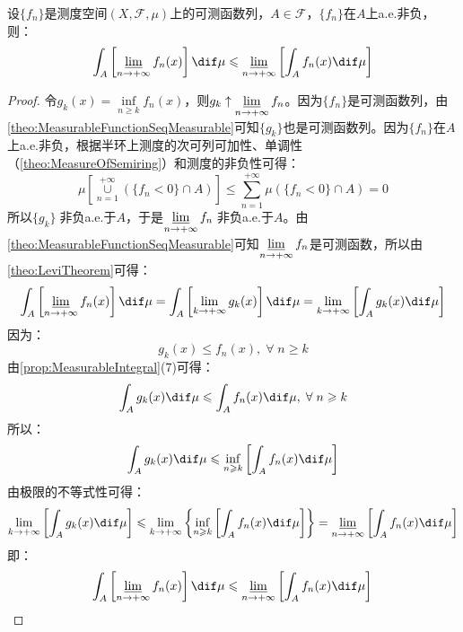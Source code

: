 \begin{theorem}\label{theo:FatouLemma}
	设$\{f_n\}$是测度空间$(X,\mathscr{F},\mu)$上的可测函数列，$A\in\mathscr{F}$，$\{f_n\}$在$A$上a.e.非负，则：
	\begin{equation*}
		\int_{A}\left[\varliminf_{n\to+\infty}f_n(x)\right]\dif\mu\leqslant\varliminf_{n\to+\infty}\left[\int_{A}f_n(x)\dif\mu\right]
	\end{equation*}
\end{theorem}
\begin{proof}
	令$g_k(x)=\inf\limits_{n\geqslant k}f_n(x)$，则$g_k\uparrow\varliminf\limits_{n\to+\infty}f_n$。因为$\{f_n\}$是可测函数列，由\cref{theo:MeasurableFunctionSeqMeasurable}可知$\{g_k\}$也是可测函数列。因为$\{f_n\}$在$A$上a.e.非负，根据半环上测度的次可列可加性、单调性（\cref{theo:MeasureOfSemiring}）和测度的非负性可得：
	\begin{equation*}
		\mu\left[\underset{n=1}{\overset{+\infty}{\cup}}(\{f_n<0\}\cap A)\right]\leqslant\sum_{n=1}^{+\infty}\mu(\{f_n<0\}\cap A)=0
	\end{equation*}
	所以$\{g_k\}\;$非负a.e.于$A$，于是$\varliminf\limits_{n\to+\infty}f_n\;$非负a.e.于$A$。由\cref{theo:MeasurableFunctionSeqMeasurable}可知$\varliminf\limits_{n\to+\infty}f_n$是可测函数，所以由\cref{theo:LeviTheorem}可得：
	\begin{align*}
		\int_{A}\left[\varliminf_{n\to+\infty}f_n(x)\right]\dif\mu=\int_{A}\left[\lim_{k\to+\infty}g_k(x)\right]\dif\mu=\lim_{k\to+\infty}\left[\int_{A}g_k(x)\dif\mu\right]
	\end{align*}
	因为：
	\begin{equation*}
		g_k(x)\leqslant f_n(x),\;\forall\;n\geqslant k
	\end{equation*}
	由\cref{prop:MeasurableIntegral}(7)可得：
	\begin{equation*}
		\int_{A}g_k(x)\dif\mu\leqslant\int_{A}f_n(x)\dif\mu,\;\forall\;n\geqslant k
	\end{equation*}
	所以：
	\begin{equation*}
		\int_{A}g_k(x)\dif\mu\leqslant\inf_{n\geqslant k}\left[\int_{A}f_n(x)\dif\mu\right]
	\end{equation*}
	由极限的不等式性可得：
	\begin{equation*}
		\lim_{k\to+\infty}\left[\int_{A}g_k(x)\dif\mu\right]\leqslant\lim_{k\to+\infty}\left\{\inf_{n\geqslant k}\left[\int_{A}f_n(x)\dif\mu\right]\right\}=\varliminf_{n\to+\infty}\left[\int_{A}f_n(x)\dif\mu\right]
	\end{equation*}
	即：
	\begin{equation*}
		\int_{A}\left[\varliminf_{n\to+\infty}f_n(x)\right]\dif\mu\leqslant\varliminf_{n\to+\infty}\left[\int_{A}f_n(x)\dif\mu\right]\qedhere
	\end{equation*}
\end{proof}
